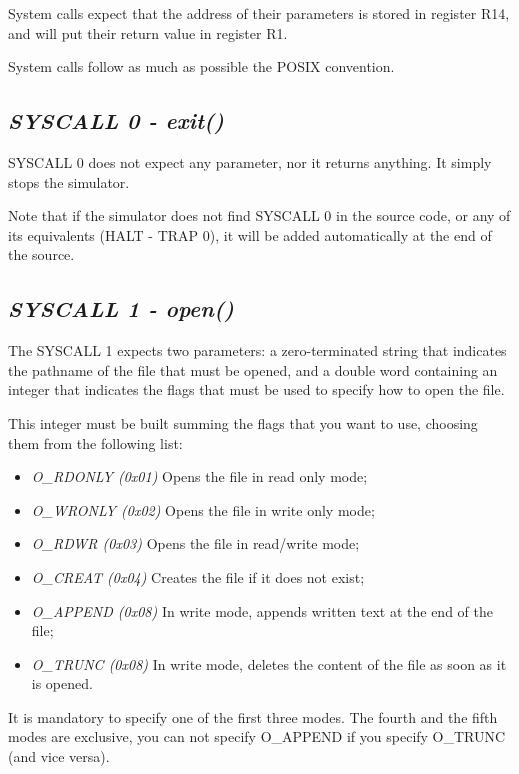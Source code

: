 \documentclass[letterpaper,10pt,english]{sphinxmanual}
\begin{document}
System calls expect that the address of their parameters is stored in register
R14, and will put their return value in register R1.

System calls follow as much as possible the POSIX convention.


\subsection{\emph{SYSCALL 0 - exit()}}
\label{instructions:syscall-0-exit}
SYSCALL 0 does not expect any parameter, nor it returns anything. It simply stops
the simulator.

Note that if the simulator does not find SYSCALL 0 in the source code, or any of
its equivalents (HALT - TRAP 0), it will be added automatically at the end of
the source.


\subsection{\emph{SYSCALL 1 - open()}}
\label{instructions:syscall-1-open}
The SYSCALL 1 expects two parameters: a zero-terminated string that indicates
the pathname of the file that must be opened, and a double word containing an
integer that indicates the flags that must be used to specify how to open the
file.

This integer must be built summing the flags that you want to use, choosing them
from the following list:
\begin{itemize}
\item {} 
\emph{O\_RDONLY (0x01)} Opens the file in read only mode;

\item {} 
\emph{O\_WRONLY (0x02)} Opens the file in write only mode;

\item {} 
\emph{O\_RDWR (0x03)} Opens the file in read/write mode;

\item {} 
\emph{O\_CREAT (0x04)} Creates the file if it does not exist;

\item {} 
\emph{O\_APPEND (0x08)} In write mode, appends written text at the end of the file;

\item {} 
\emph{O\_TRUNC (0x08)} In write mode, deletes the content of the file as soon as it is opened.

\end{itemize}

It is mandatory to specify one of the first three modes. The fourth and the
fifth modes are exclusive, you can not specify O\_APPEND if you specify O\_TRUNC
(and vice versa).
\end{document}

